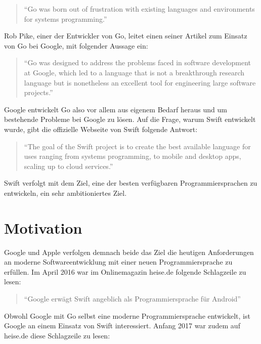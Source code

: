 \begin{quote}
\enquote{Go was born out of frustration with existing languages and environments for systems programming.}\cite{Golang.FAQ}
\end{quote}

Rob Pike, einer der Entwickler von Go, leitet einen seiner Artikel zum Einsatz von Go bei Google, mit folgender Aussage ein:

\begin{quote}
\enquote{Go was designed to address the problems faced in software development at Google, which led to a language that is not a breakthrough research language but is nonetheless an excellent tool for engineering large software projects.}\cite{RobPike.2012}
\end{quote}

Google entwickelt Go also vor allem aus eigenem Bedarf heraus und um bestehende Probleme bei Google zu lösen.
Auf die Frage, warum Swift entwickelt wurde, gibt die offizielle Webseite von Swift folgende Antwort:

\begin{quote}
\enquote{The goal of the Swift project is to create the best available language for uses ranging from systems programming, to mobile and desktop apps, scaling up to cloud services.}\cite{Swift.Homepage}
\end{quote}

Swift verfolgt mit dem Ziel, eine der besten verfügbaren Programmiersprachen zu entwickeln, ein sehr ambitioniertes Ziel.

\section{Motivation}
Google und Apple verfolgen demnach beide das Ziel die heutigen Anforderungen an moderne Softwareentwicklung mit einer neuen Programmiersprache zu erfüllen.  
Im April 2016 war im Onlinemagazin heise.de folgende Schlagzeile zu lesen:

\begin{quote}
\enquote{Google erwägt Swift angeblich als Programmiersprache für Android}\cite{Becker}
\end{quote}

Obwohl Google mit Go selbst eine moderne Programmiersprache entwickelt, ist Google an einem Einsatz von Swift interessiert.
Anfang 2017 war zudem auf heise.de diese Schlagzeile zu lesen:

